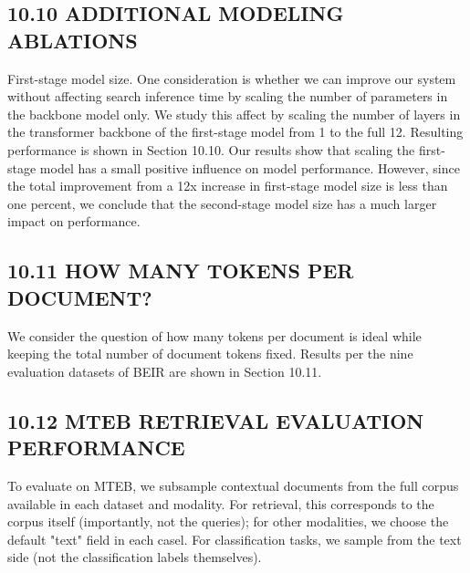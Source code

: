 \subsection*{10.10 ADDITIONAL MODELING ABLATIONS}
First-stage model size. One consideration is whether we can improve our system without affecting search inference time by scaling the number of parameters in the backbone model only. We study this affect by scaling the number of layers in the transformer backbone of the first-stage model from 1 to the full 12. Resulting performance is shown in Section 10.10.
Our results show that scaling the first-stage model has a small positive influence on model performance. However, since the total improvement from a 12x increase in first-stage model size is less than one percent, we conclude that the second-stage model size has a much larger impact on performance.
\subsection*{10.11 HOW MANY TOKENS PER DOCUMENT?}
We consider the question of how many tokens per document is ideal while keeping the total number of document tokens fixed. Results per the nine evaluation datasets of BEIR are shown in Section 10.11.
\subsection*{10.12 MTEB RETRIEVAL EVALUATION PERFORMANCE}
To evaluate on MTEB, we subsample contextual documents from the full corpus available in each dataset and modality. For retrieval, this corresponds to the corpus itself (importantly, not the queries); for other modalities, we choose the default "text" field in each casel. For classification tasks, we sample from the text side (not the classification labels themselves).

